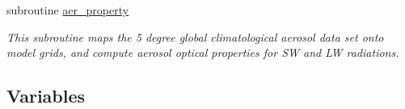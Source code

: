 {\bf }\par
\begin{DoxyCompactItemize}
\item 
subroutine \hyperlink{group__module__radiation__aerosols_ga021aee92f6c64f78fc11e26d5b2288cf}{aer\+\_\+property}
\begin{DoxyCompactList}\small\item\em This subroutine maps the 5 degree global climatological aerosol data set onto model grids, and compute aerosol optical properties for SW and LW radiations. \end{DoxyCompactList}\end{DoxyCompactItemize}

\subsection*{Variables}
